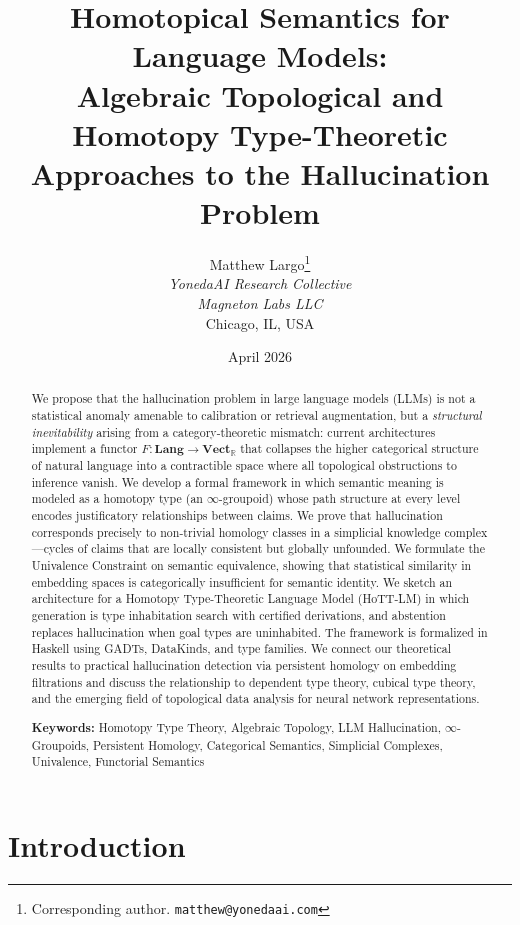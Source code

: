 \documentclass[11pt,a4paper,twocolumn]{article}
\title{%
  \textbf{Homotopical Semantics for Language Models:}\\[4pt]
  \large Algebraic Topological and Homotopy Type-Theoretic\\
  Approaches to the Hallucination Problem%
}
\author{%
  Matthew Largo\thanks{%
    Corresponding author. \texttt{matthew@yonedaai.com}%
  }\\
  \textit{YonedaAI Research Collective}\\
  \textit{Magneton Labs LLC}\\
  Chicago, IL, USA
}
\date{April 2026}
\theoremstyle{plain}
\theoremstyle{definition}
\newcommand{\Lang}{\mathbf{Lang}}
\newcommand{\Vect}{\mathbf{Vect}}
\begin{document}
\maketitle

\begin{abstract}
\noindent
We propose that the hallucination problem in large language models (LLMs) is not a statistical anomaly amenable to calibration or retrieval augmentation, but a \emph{structural inevitability} arising from a category-theoretic mismatch: current architectures implement a functor $F\colon \Lang \to \Vect_{\mathbb{R}}$ that collapses the higher categorical structure of natural language into a contractible space where all topological obstructions to inference vanish. We develop a formal framework in which semantic meaning is modeled as a homotopy type (an $\infty$-groupoid) whose path structure at every level encodes justificatory relationships between claims. We prove that hallucination corresponds precisely to non-trivial homology classes in a simplicial knowledge complex---cycles of claims that are locally consistent but globally unfounded. We formulate the Univalence Constraint on semantic equivalence, showing that statistical similarity in embedding spaces is categorically insufficient for semantic identity. We sketch an architecture for a Homotopy Type-Theoretic Language Model (HoTT-LM) in which generation is type inhabitation search with certified derivations, and abstention replaces hallucination when goal types are uninhabited. The framework is formalized in Haskell using GADTs, DataKinds, and type families. We connect our theoretical results to practical hallucination detection via persistent homology on embedding filtrations and discuss the relationship to dependent type theory, cubical type theory, and the emerging field of topological data analysis for neural network representations.

\medskip
\noindent\textbf{Keywords:} Homotopy Type Theory, Algebraic Topology, LLM Hallucination, $\infty$-Groupoids, Persistent Homology, Categorical Semantics, Simplicial Complexes, Univalence, Functorial Semantics
\end{abstract}

\section{Introduction}\label{sec:intro}
\end{document}
